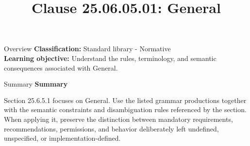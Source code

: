 \documentclass[10pt,letterpaper]{article}
\title{Clause 25.06.05.01: General}
\author{}
\date{}
\begin{document}
\maketitle
\begin{CornellOverviewBox}{Overview}
\textbf{Classification:} Standard library - Normative\\[2pt]
\textbf{Learning objective:} Understand the rules, terminology, and semantic consequences associated with General.
\end{CornellOverviewBox}\begin{CornellSummaryBox}{Summary}
{\sffamily\bfseries\color{Accent} Summary}\par\vspace{3pt}Section 25.6.5.1 focuses on General. Use the listed grammar productions together with the semantic constraints and disambiguation rules referenced by the section. When applying it, preserve the distinction between mandatory requirements, recommendations, permissions, and behavior deliberately left undefined, unspecified, or implementation-defined.
\end{CornellSummaryBox}
\end{document}
